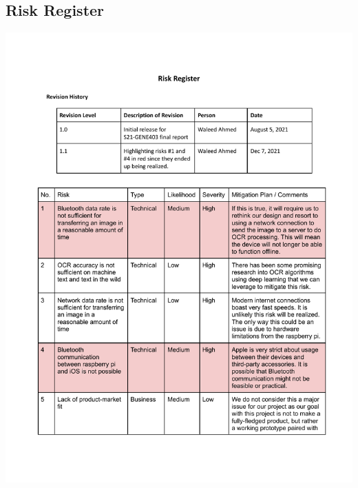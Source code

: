 \documentclass[a4paper,11pt]{article}
\begin{document}
\subsection{Risk Register}
\includegraphics[page=1,width={1.0\linewidth}]{pdf/risk-register-1.1.pdf}
\newpage
\end{document}
